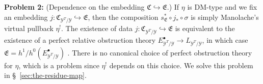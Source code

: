 \bigskip

\noindent\textbf{Problem 2:} (Dependence on the embedding \(\mathfrak C\hookrightarrow \mathfrak E\).) If \(\eta\) is DM-type and we fix an embedding \(j:\mathfrak C_{\mathcal Y^T/\mathcal Y}\hookrightarrow \mathfrak E\), then the composition \(s^*_{\mathfrak E}\circ j_*\circ \sigma\) is simply Manolache's virtual pullback \(\eta^!\). The existence of data \(j:\mathfrak C_{\mathcal Y^T/\mathcal Y}\hookrightarrow \mathfrak E\) is equivalent to the existence of a perfect relative obstruction theory \(E^\bullet_{\mathcal Y^T/\mathcal Y} \to L_{\mathcal Y^T/\mathcal Y}\), in which case \(\mathfrak E = h^1/h^0(E^\bullet_{\mathcal Y^T/\mathcal Y})\) \cite[Proposition 3.11]{manolache_VirtualPullbacks2012}. There is no canonical choice of perfect obstruction theory for \(\eta\), which is a problem since \(\eta^!\) depends on this choice. We solve this problem in \S~\ref{sec:the-residue-map}.


